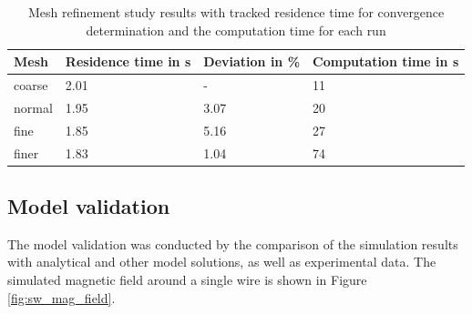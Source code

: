 \begin{table}[H]
\centering
\caption[Mesh refinement study results]{Mesh refinement study results with tracked residence time for convergence determination and the computation time for each run}
\label{table:Mesh_Ref_res}
\begin{tabularx}{\textwidth}{XXXX}
\hline
Mesh & Residence time in s & Deviation in \% & Computation time in s\\
\hline\hline
coarse &  2.01 & -  & 11\\
normal & 1.95 & 3.07 & 20\\
fine &  1.85 & 5.16 & 27 \\
finer &  1.83 & 1.04 & 74\\
\hline
\end{tabularx}
\end{table}

\subsection{Model validation}
\label{subsec:mod_val}

The model validation was conducted by the comparison of the simulation results with analytical and other model solutions, as well as experimental data.
The simulated magnetic field around a single wire is shown in Figure\,\ref{fig:sw_mag_field}. 

